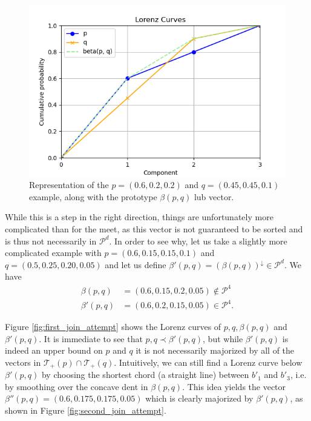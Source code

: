 \begin{figure}[h!] 
    \centering
    \includegraphics[scale=0.6]{images/join_naive_attempt.png}
    \caption{Representation of the $p = (0.6, 0.2, 0.2)$ and $q = (0.45, 0.45, 0.1)$ example, along with the prototype $\beta(p, q)$ lub vector.} \label{fig:join_naive_attempt}
\end{figure}

While this is a step in the right direction, things are unfortunately more complicated than for the meet, as this vector is not guaranteed to be sorted and is thus not necessarily in $\mathcal{P}^d$. In order to see why, let us take a slightly more complicated example with $p = (0.6, 0.15, 0.15, 0.1)$ and $q = (0.5, 0.25, 0.20, 0.05)$ and let us define $\beta'(p, q) = (\beta(p, q))^\downarrow \in \mathcal{P}^d$. We have
\begin{align}
    \beta(p, q) &= (0.6, 0.15, 0.2, 0.05) \notin \mathcal{P}^4 \\
    \beta'(p, q) &= (0.6, 0.2, 0.15, 0.05) \in \mathcal{P}^4.
\end{align}

Figure \ref{fig:first_join_attempt} shows the Lorenz curves of $p, q, \beta(p, q)$ and $\beta'(p, q)$. It is immediate to see that $p, q \prec \beta'(p, q)$, but while $\beta'(p, q)$  is indeed an upper bound on $p$ and $q$ it is not necessarily majorized by all of the vectors in $\mathcal{T}_+(p) \cap \mathcal{T}_+(q)$. Intuitively, we can still find a Lorenz curve below $\beta'(p, q)$ by choosing the shortest chord (a straight line) between $b'_1$ and $b'_3$, i.e. by smoothing over the concave dent in $\beta(p, q)$. This idea yields the vector $\beta''(p, q) = (0.6, 0.175, 0.175, 0.05)$ which is clearly majorized by $\beta'(p, q)$, as shown in Figure \ref{fig:second_join_attempt}.

